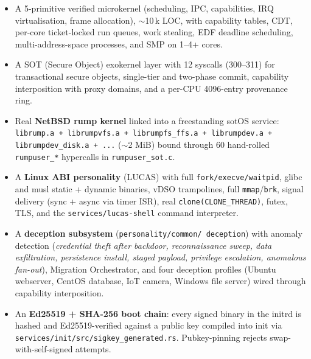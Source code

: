 \documentclass[11pt,a4paper]{article}
\begin{document}
\begin{itemize}[leftmargin=1.4em,itemsep=0.3em]
  \item A 5-primitive verified microkernel
        (scheduling, IPC, capabilities, IRQ virtualisation, frame
        allocation), $\sim$10\,k LOC, with capability tables, CDT,
        per-core ticket-locked run queues, work stealing, EDF
        deadline scheduling, multi-address-space processes, and SMP
        on 1--4+ cores.

  \item A SOT (Secure Object) exokernel layer with 12 syscalls
        (300--311) for transactional secure objects, single-tier and
        two-phase commit, capability interposition with proxy
        domains, and a per-CPU 4096-entry provenance ring.

  \item Real \textbf{NetBSD rump kernel} linked into a freestanding
        sotOS service: \texttt{librump.a + librumpvfs.a +
        librumpfs\_ffs.a + librumpdev.a + librumpdev\_disk.a + ...}
        ($\sim$2 MiB) bound through 60 hand-rolled \texttt{rumpuser\_*}
        hypercalls in \texttt{rumpuser\_sot.c}.

  \item A \textbf{Linux ABI personality} (LUCAS) with full
        \texttt{fork/execve/waitpid}, glibc and musl static + dynamic
        binaries, vDSO trampolines, full \texttt{mmap}/\texttt{brk},
        signal delivery (sync + async via timer ISR), real
        \texttt{clone(CLONE\_THREAD)}, futex, TLS, and the
        \texttt{services/lucas-shell} command interpreter.

  \item A \textbf{deception subsystem} (\texttt{personality/common/
        deception}) with anomaly detection (\textit{credential theft
        after backdoor, reconnaissance sweep, data exfiltration,
        persistence install, staged payload, privilege escalation,
        anomalous fan-out}), Migration Orchestrator, and four
        deception profiles (Ubuntu webserver, CentOS database, IoT
        camera, Windows file server) wired through capability
        interposition.

  \item An \textbf{Ed25519 + SHA-256 boot chain}: every signed
        binary in the initrd is hashed and Ed25519-verified against
        a public key compiled into init via
        \texttt{services/init/src/sigkey\_generated.rs}.
        Pubkey-pinning rejects swap-with-self-signed attempts.


\end{itemize}
\end{document}
